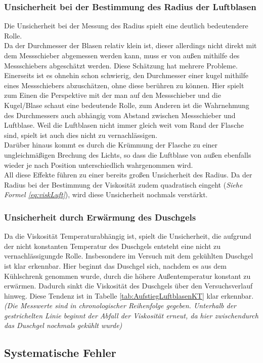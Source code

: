 \documentclass{report}
\begin{document}
\subsubsection{Unsicherheit bei der Bestimmung des Radius der Luftblasen}
Die Unsicherheit bei der Messung des Radius spielt eine deutlich bedeutendere Rolle. \\Da der Durchmesser der Blasen relativ klein ist, dieser allerdings nicht direkt mit dem Messschieber abgemessen werden kann,
muss er von außen mithilfe des Messschiebers abgeschätzt werden. Diese Schätzung hat mehrere Probleme.
Einerseits ist es ohnehin schon schwierig, den Durchmesser einer kugel mithilfe eines Messschiebers abzuschätzen, ohne diese berühren zu können. Hier spielt zum Einen 
die Perspektive mit der man auf den Messschieber und die Kugel/Blase schaut eine bedeutende Rolle, zum Anderen ist die Wahrnehmung des Durchmessers auch abhängig
vom Abstand zwischen Messschieber und Luftblase. Weil die Luftblasen nicht immer gleich weit vom Rand der Flasche sind, spielt ist auch dies nicht zu vernachlässigen. \\
Darüber hinaus kommt es durch die Krümmung der Flasche zu einer ungleichmäßigen Brechung des Lichts, so dass die Luftblase von außen ebenfalls wieder je nach Position unterschiedlich wahrgenommen wird. \\
All diese Effekte führen zu einer bereits großen Unsicherheit des Radius. Da der Radius bei der Bestimmung der Viskosität zudem quadratisch eingeht (\textit{Siehe Formel \ref{eq:viskLuft}}), wird diese 
Unsicherheit nochmals verstärkt.
\subsubsection{Unsicherheit durch Erwärmung des Duschgels}
Da die Viskosität Temperaturabhängig ist, spielt die Unsicherheit, die aufgrund der nicht konstanten Temperatur des Duschgels entsteht eine nicht zu vernachlässigungde
Rolle. Insbesondere im Versuch mit dem gekühlten Duschgel ist klar erkennbar. Hier beginnt das Duschgel sich, nachdem es aus dem Kühlschrenk genommen wurde, durch die 
höhere Außentemperatur konstant zu erwärmen. Dadurch sinkt die Viskosität des Duschgels über den Versuchsverlauf hinweg. Diese Tendenz ist in Tabelle \ref{tab:AufstiegLuftblasenKT}
klar erkennbar. \textit{(Die Messwerte sind in chronologischer Reihenfolge gegeben. Unterhalb der gestrichelten Linie beginnt der Abfall der Viskosität
erneut, da hier zwischendurch das Duschgel nochmals gekühlt wurde)}
\subsection{Systematische Fehler}
\end{document}
